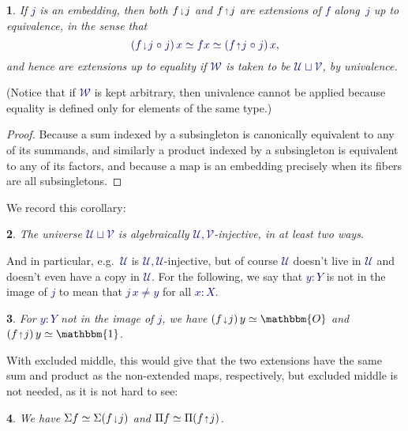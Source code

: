\documentclass[10pt]{article}
\newcommand{\db}{\textcolor{darkblue}}
\newcommand{\m}[1]{\db{$#1$}}
\newcommand{\M}[1]{\[\db{#1}\]}
\newcommand{\comp}{\mathrel{\circ}}
\newcommand{\U}{\mathcal{U}}
\newcommand{\V}{\mathcal{V}}
\newcommand{\W}{\mathcal{W}}
\newcommand{\Zero}{\mathbbm{O}}
\newcommand{\One}{\mathbbm{1}}
\newcommand{\edown}{\scaleobj{0.7}{\,\downarrow\,}}
\newcommand{\eup}{\scaleobj{0.7}{\,\uparrow\,}}
\newtheorem{numbered}{}
\theoremstyle{definition}
\begin{document}
\begin{numbered}
    If \m{j} is an embedding, then both \m{f \edown j} and \m{f \eup j} are extensions of \m{f} along~\m{j} up to equivalence, in the sense that \M{(f \edown j \comp j) \, x \simeq f x \simeq (f \eup j \comp j) \, x,}
and hence are extensions up to equality if \m{\W} is taken to be \m{\U \sqcup \V}, by univalence.
\end{numbered}
\noindent (Notice that if \m{\W} is kept arbitrary, then univalence cannot be applied because equality is defined only for elements of the same type.)
\begin{proof}
Because a sum indexed by a subsingleton is canonically equivalent to any of its
summands, and similarly a product indexed by a subsingleton is equivalent to
any of its factors, and because a map is an embedding precisely when
its fibers are all subsingletons.
\end{proof}
\noindent We record this corollary:
\begin{numbered}
  The universe \m{\U \sqcup \V} is algebraically \m{\U,\V}-injective, in at least two ways.
\end{numbered}
And in particular, e.g.\ \m{\U} is \m{\U,\U}-injective, but of course
\m{\U} doesn't live in \m{\U} and doesn't even have a copy in
\m{\U}. For the following, we say that \m{y : Y} is not in the image
of \m{j} to mean that \m{j \, x \ne y} for all \m{x:X}.
\begin{numbered}
        For \m{y:Y} not in the image of \m{j}, we have
        \m{(f \edown j) \, y \simeq \Zero} and
        \m{(f \eup j) \, y \simeq \One}.
  \end{numbered}
\noindent With excluded middle, this would give that the two extensions have
the same sum and product as the non-extended maps, respectively, but
excluded middle is not needed, as it is not hard to see:
\begin{numbered} We have
\m{\Sigma f \simeq \Sigma (f \edown j)} and
\m{\Pi f \simeq \Pi (f \eup j)}.
\end{numbered}
\end{document}
